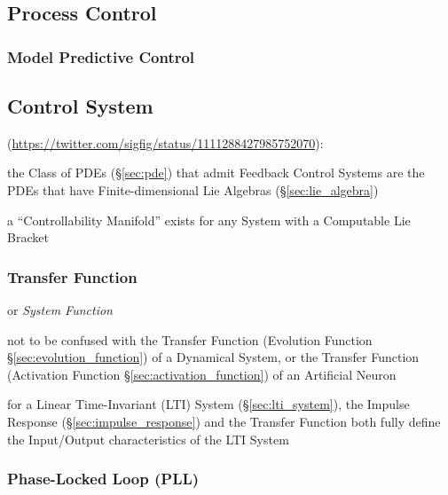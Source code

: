 \subsection{Process Control}\label{sec:process_control}

\subsubsection{Model Predictive Control}\label{sec:model_predictive_control}



\subsection{Control System}\label{sec:control_system}

(\url{https://twitter.com/sigfig/status/1111288427985752070}):

the Class of PDEs (\S\ref{sec:pde}) that admit Feedback Control Systems are the
PDEs that have Finite-dimensional Lie Algebras (\S\ref{sec:lie_algebra})

a ``Controllability Manifold'' exists for any System with a Computable Lie
Bracket



\subsubsection{Transfer Function}\label{sec:transfer_function}

or \emph{System Function}

not to be confused with the Transfer Function (Evolution Function
\S\ref{sec:evolution_function}) of a Dynamical System, or the Transfer Function
(Activation Function \S\ref{sec:activation_function}) of an Artificial Neuron

for a Linear Time-Invariant (LTI) System (\S\ref{sec:lti_system}), the Impulse
Response (\S\ref{sec:impulse_response}) and the Transfer Function both fully
define the Input/Output characteristics of the LTI System



\subsubsection{Phase-Locked Loop (PLL)}\label{sec:pll}

